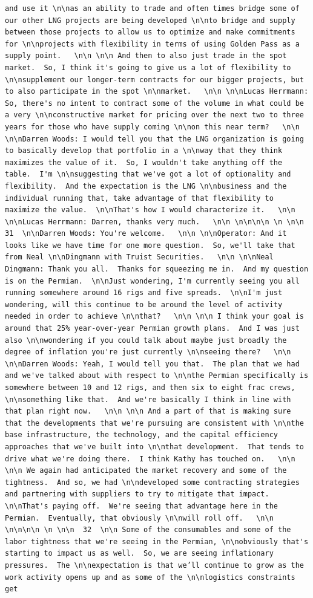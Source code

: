 \documentclass[
  letterpaper,
  DIV=11,
  numbers=noendperiod]{scrreprt}
\begin{document}
\begin{verbatim}
and use it \n\nas an ability to trade and often times bridge some of our other LNG projects are being developed \n\nto bridge and supply between those projects to allow us to optimize and make commitments for \n\nprojects with flexibility in terms of using Golden Pass as a supply point.   \n\n \n\n And then to also just trade in the spot market.  So, I think it's going to give us a lot of flexibility to \n\nsupplement our longer-term contracts for our bigger projects, but to also participate in the spot \n\nmarket.   \n\n \n\nLucas Herrmann: So, there's no intent to contract some of the volume in what could be a very \n\nconstructive market for pricing over the next two to three years for those who have supply coming \n\non this near term?   \n\n \n\nDarren Woods: I would tell you that the LNG organization is going to basically develop that portfolio in a \n\nway that they think maximizes the value of it.  So, I wouldn't take anything off the table.  I'm \n\nsuggesting that we've got a lot of optionality and flexibility.  And the expectation is the LNG \n\nbusiness and the individual running that, take advantage of that flexibility to maximize the value.  \n\nThat's how I would characterize it.   \n\n \n\nLucas Herrmann: Darren, thanks very much.   \n\n \n\n\n\n \n \n\n  31  \n\nDarren Woods: You're welcome.   \n\n \n\nOperator: And it looks like we have time for one more question.  So, we'll take that from Neal \n\nDingmann with Truist Securities.   \n\n \n\nNeal Dingmann: Thank you all.  Thanks for squeezing me in.  And my question is on the Permian.  \n\nJust wondering, I'm currently seeing you all running somewhere around 16 rigs and five spreads.  \n\nI'm just wondering, will this continue to be around the level of activity needed in order to achieve \n\nthat?   \n\n \n\n I think your goal is around that 25% year-over-year Permian growth plans.  And I was just also \n\nwondering if you could talk about maybe just broadly the degree of inflation you're just currently \n\nseeing there?   \n\n \n\nDarren Woods: Yeah, I would tell you that.  The plan that we had and we've talked about with respect to \n\nthe Permian specifically is somewhere between 10 and 12 rigs, and then six to eight frac crews, \n\nsomething like that.  And we're basically I think in line with that plan right now.   \n\n \n\n And a part of that is making sure that the developments that we're pursuing are consistent with \n\nthe base infrastructure, the technology, and the capital efficiency approaches that we've built into \n\nthat development.  That tends to drive what we're doing there.  I think Kathy has touched on.   \n\n \n\n We again had anticipated the market recovery and some of the tightness.  And so, we had \n\ndeveloped some contracting strategies and partnering with suppliers to try to mitigate that impact.  \n\nThat's paying off.  We're seeing that advantage here in the Permian.  Eventually, that obviously \n\nwill roll off.   \n\n \n\n\n\n \n \n\n  32  \n\n Some of the consumables and some of the labor tightness that we're seeing in the Permian, \n\nobviously that's starting to impact us as well.  So, we are seeing inflationary pressures.  The \n\nexpectation is that we’ll continue to grow as the work activity opens up and as some of the \n\nlogistics constraints get 
\end{verbatim}
\end{document}
